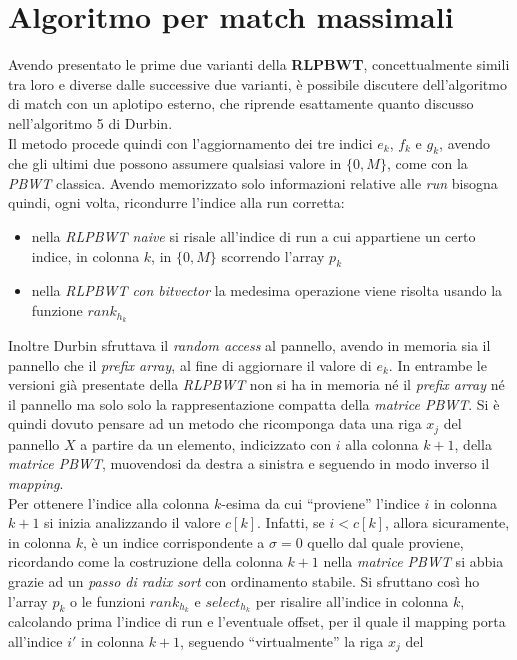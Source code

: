 \section{Algoritmo per match massimali}
Avendo presentato le prime due varianti della \textbf{RLPBWT}, concettualmente
simili tra loro e diverse dalle successive due varianti, è possibile discutere
dell'algoritmo di match con un aplotipo esterno, che riprende esattamente quanto
discusso nell'algoritmo 5 di Durbin.\\
Il metodo procede quindi con l'aggiornamento dei tre indici $e_k$, $f_k$ e
$g_k$, avendo che gli ultimi due possono assumere qualsiasi valore in $\{0,M\}$,
come con la \textit{PBWT} classica. Avendo memorizzato solo informazioni
relative alle \textit{run} bisogna quindi, ogni volta, ricondurre l'indice alla
run corretta:
\begin{itemize}
  \item nella \textit{RLPBWT naive} si risale all'indice di run a cui appartiene
  un certo indice, in colonna $k$, in $\{0,M\}$ scorrendo l'array $p_k$
  \item nella \textit{RLPBWT con bitvector} la medesima operazione viene risolta
  usando la funzione $rank_{h_k}$
\end{itemize}
Inoltre Durbin sfruttava il \textit{random access} al pannello, avendo in
memoria sia il pannello che il \textit{prefix array}, al fine di aggiornare il
valore di $e_k$. In entrambe le versioni già presentate della \textit{RLPBWT}
non si ha in memoria né il \textit{prefix array} né il pannello ma solo solo la
rappresentazione compatta della \textit{matrice PBWT}. Si è quindi dovuto
pensare ad un metodo che ricomponga data una riga $x_j$ del pannello $X$ a
partire da un elemento, indicizzato con $i$ alla colonna $k+1$, della
\textit{matrice PBWT}, muovendosi da destra a sinistra e seguendo in modo
inverso il \textit{mapping}.\\ 
Per ottenere l'indice alla colonna $k$-esima da cui ``proviene'' l'indice $i$ in
colonna $k+1$ si inizia analizzando il valore $c[k]$. Infatti, se $i<c[k]$,
allora sicuramente, in colonna $k$, è un indice corrispondente a $\sigma=0$
quello dal quale proviene, ricordando come la costruzione della colonna $k+1$
nella \textit{matrice PBWT} si abbia grazie ad un \textit{passo di radix sort}
con ordinamento stabile. Si sfruttano così ho l'array $p_k$ o le funzioni
$rank_{h_k}$ e $select_{h_k}$ per risalire all'indice in colonna $k$, calcolando
prima l'indice di run e l'eventuale offset, per il quale il mapping porta
all'indice $i'$ in colonna $k+1$, seguendo ``virtualmente'' la riga $x_j$ del
